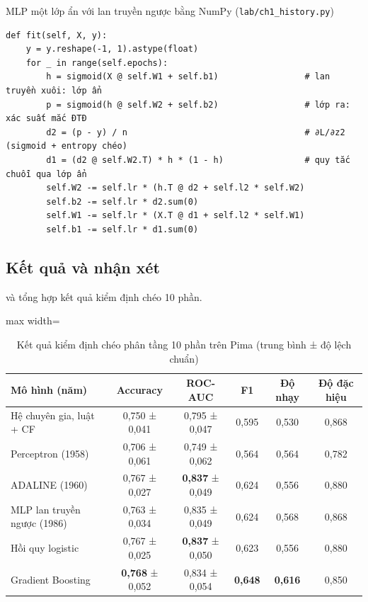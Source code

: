 \begin{code}{MLP một lớp ẩn với lan truyền ngược bằng NumPy (\texttt{lab/ch1\_history.py})}
\label{lst:ch1-mlp}
\begin{verbatim}
def fit(self, X, y):
    y = y.reshape(-1, 1).astype(float)
    for _ in range(self.epochs):
        h = sigmoid(X @ self.W1 + self.b1)                 # lan truyền xuôi: lớp ẩn
        p = sigmoid(h @ self.W2 + self.b2)                 # lớp ra: xác suất mắc ĐTĐ
        d2 = (p - y) / n                                   # ∂L/∂z2 (sigmoid + entropy chéo)
        d1 = (d2 @ self.W2.T) * h * (1 - h)                # quy tắc chuỗi qua lớp ẩn
        self.W2 -= self.lr * (h.T @ d2 + self.l2 * self.W2)
        self.b2 -= self.lr * d2.sum(0)
        self.W1 -= self.lr * (X.T @ d1 + self.l2 * self.W1)
        self.b1 -= self.lr * d1.sum(0)
\end{verbatim}
\end{code}

\subsection{Kết quả và nhận xét}

 và  tổng hợp kết quả kiểm định chéo 10 phần.

\begin{table}[H]
\centering
\caption{Kết quả kiểm định chéo phân tầng 10 phần trên Pima (trung bình ± độ lệch chuẩn)}
\label{tab:ch1-results}
\small
\begin{adjustbox}{max width=\linewidth}
\begin{tabular}{@{}lccccc@{}}
\toprule
\textbf{Mô hình (năm)} & \textbf{Accuracy} & \textbf{ROC-AUC} & \textbf{F1} & \textbf{Độ nhạy} & \textbf{Độ đặc hiệu} \\
\midrule
Hệ chuyên gia, luật + CF & 0,750 ± 0,041 & 0,795 ± 0,047 & 0,595 & 0,530 & 0,868 \\
Perceptron (1958) & 0,706 ± 0,061 & 0,749 ± 0,062 & 0,564 & 0,564 & 0,782 \\
ADALINE (1960) & 0,767 ± 0,027 & \textbf{0,837} ± 0,049 & 0,624 & 0,556 & 0,880 \\
MLP lan truyền ngược (1986) & 0,763 ± 0,034 & 0,835 ± 0,049 & 0,624 & 0,568 & 0,868 \\
Hồi quy logistic & 0,767 ± 0,025 & \textbf{0,837} ± 0,050 & 0,623 & 0,556 & 0,880 \\
Gradient Boosting & \textbf{0,768} ± 0,052 & 0,834 ± 0,054 & \textbf{0,648} & \textbf{0,616} & 0,850 \\
\bottomrule
\end{tabular}
\end{adjustbox}
\end{table}

